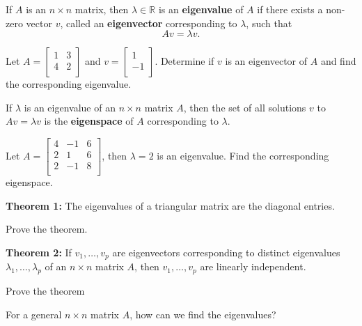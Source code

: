 \newpage

\begin{defn}
If $A$ is an $n \times n$ matrix, then $\lambda \in \mathbb{R}$ is an {\bf eigenvalue} of $A$ if there exists a non-zero vector $v$, called an {\bf eigenvector} corresponding to $\lambda$, such that $$Av=\lambda v.$$
\end{defn}

\begin{enumerate}

\Problem Let $A=\begin{bmatrix} 1 & 3\\ 4 & 2\\ \end{bmatrix}$ and $v=\begin{bmatrix} 1 \\ -1\\ \end{bmatrix}$. Determine if $v$ is an eigenvector of $A$ and find the corresponding eigenvalue.

\vfill

\newpage

\begin{defn} If $\lambda$ is an eigenvalue of an $n \times n$ matrix $A$, then the set of all solutions $v$ to $Av = \lambda v$ is the {\bf eigenspace} of $A$ corresponding to $\lambda$.
\end{defn}

\Problem Let $A=\begin{bmatrix} 4 & -1 & 6\\ 2 & 1 & 6\\ 2 & -1 & 8\\ \end{bmatrix}$, then $\lambda=2$ is an eigenvalue. Find the corresponding eigenspace.

\vfill

{\bf Theorem 1:} The eigenvalues of a triangular matrix are the diagonal entries.

\Problem Prove the theorem.

\vfill

\newpage

{\bf Theorem 2:} If $v_1, \dots, v_p$ are eigenvectors corresponding to distinct eigenvalues $\lambda_1, \dots, \lambda_p$ of an $n\times n$ matrix $A$, then $v_1, \dots, v_p$ are linearly independent.

\Problem Prove the theorem

\vfill

\Problem For a general $n \times n$ matrix $A$, how can we find the eigenvalues?


\end{enumerate}
